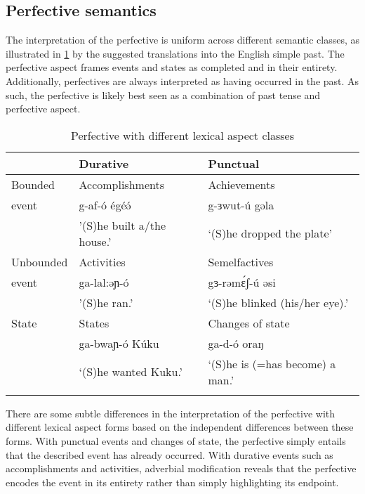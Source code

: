 
\subsection{Perfective semantics}\label{sec:ch11:perfectivesem}

The interpretation of the perfective is uniform across different semantic classes, as illustrated in \ref{tab:ch11:pfvasp} by the suggested translations into the English simple past. The perfective aspect frames events and states as completed and in their entirety. Additionally, perfectives are always interpreted as having occurred in the past. As such, the perfective is likely best seen as a combination of past tense and perfective aspect.

\begin{table}
\begin{tabular}{lll}
\lsptoprule
			&	Durative 				&	Punctual \\
			\midrule 
Bounded		&	Accomplishments 		&	Achievements\\
event		&  g-af-ó égéə́   				&	g-ɜwut-ú gəla \\ 
			& '(S)he built a/the house.' 	& `(S)he dropped the plate'\\
\midrule
Unbounded	&  Activities				& 	Semelfactives \\
event			&  ga-lal:əɲ-ó			&	gɜ-rəmɛ́ʃ-ú əsi \\ 
			& '(S)he ran.' 					&  `(S)he blinked (his/her eye).'\\
\midrule 
State		&  States 					&  Changes of state\\
			& ga-bwaɲ-ó Kúku			& ga-d-ó oraŋ\\
			& 	`(S)he wanted Kuku.'			& `(S)he is (=has become) a man.' \\%
\lspbottomrule
\end{tabular}	
\caption{Perfective with different lexical aspect classes}\label{tab:ch11:pfvasp}
\end{table}

There are some subtle differences in the interpretation of the perfective with different lexical aspect forms based on the independent differences between these forms. With punctual events and changes of state, the perfective simply entails that the described event has already occurred. With  durative events such as accomplishments and activities, adverbial modification reveals that the perfective encodes the event in its entirety rather than simply highlighting its endpoint.

